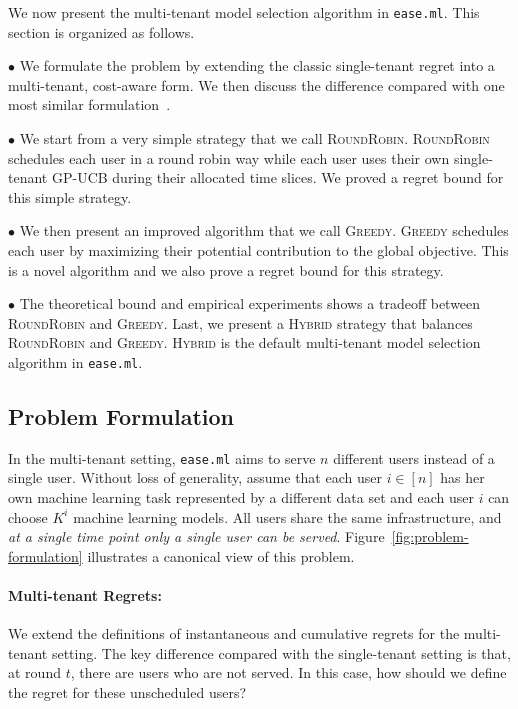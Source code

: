 \documentclass[letterpaper]{vldb}
\newcommand{\eml}{\texttt{ease.ml}\xspace}
\newcommand{\rr}{\textsc{RoundRobin}\xspace}
\newcommand{\hybrid}{\textsc{Hybrid}\xspace}
\newcommand{\greedy}{\textsc{Greedy}\xspace}
\begin{document}
We now present the multi-tenant model selection
algorithm in \eml. This section is organized as follows.

\noindent
$\bullet$ We formulate the problem 
by extending the classic single-tenant regret
into a multi-tenant, cost-aware form. We then 
discuss the difference compared with
one most similar formulation~\cite{XXX}.

\noindent
$\bullet$
We start from a very simple strategy that we call
\rr. \rr schedules
each user in a round robin way while each user
uses their own single-tenant GP-UCB
during their allocated time slices. We proved 
a regret bound for this simple strategy.

\noindent
$\bullet$
We then present an improved algorithm that we
call \greedy. \greedy schedules
each user by maximizing their potential contribution
to the global objective. This is a novel algorithm
and we also prove a regret bound for this strategy.

\noindent
$\bullet$
The theoretical bound and empirical experiments
shows a tradeoff between \rr and
\greedy. Last, we present a \hybrid 
strategy that balances 
\rr and \greedy. \hybrid is the 
default multi-tenant model selection algorithm
in \eml.


\vspace{-0.5em}
\subsection{Problem Formulation}

In the multi-tenant setting, \eml aims
to serve $n$ different users instead of a single user.
Without loss of generality, assume that
each user $i\in[n]$ has her own machine learning 
task represented by a different data set
and each user $i$ can choose
$K^{i}$ machine learning models.
All users share the same infrastructure,
and {\em at a single time point only
a single user can be served}.
Figure~\ref{fig:problem-formulation} illustrates 
a canonical view of this problem.

\vspace{-0.5em}
\paragraph*{Multi-tenant Regrets:} 
We extend the definitions of instantaneous and cumulative 
regrets for the multi-tenant setting. The key difference
compared with the single-tenant setting is that,
at round $t$, there are users who are not
served. In this case, how should we define
the regret for these unscheduled users?
\end{document}
